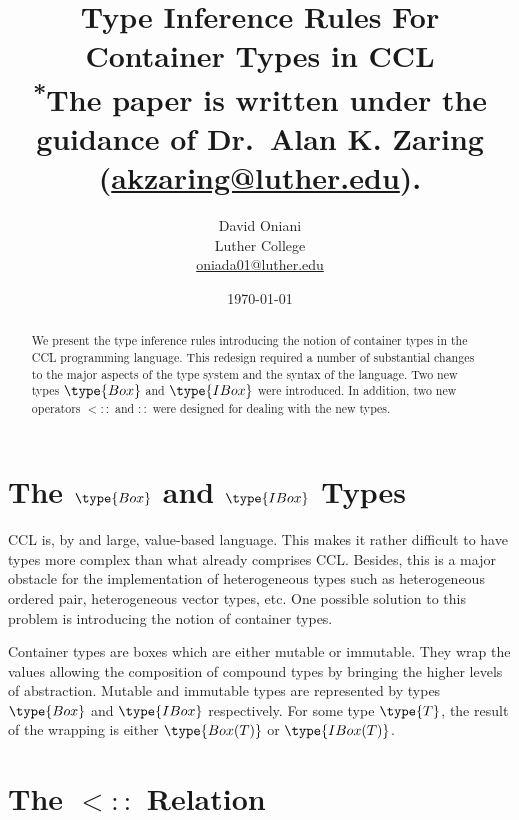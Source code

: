 \documentclass{article}
\author{David Oniani\\
        Luther College\\
        \href{mailto:oniada01@luther.edu}{oniada01@luther.edu}}
\title{\textbf{Type Inference Rules For Container Types in CCL}\\
       \medskip
       \small \textsuperscript{*}The paper is written under the guidance of
       Dr.\ Alan K. Zaring
       (\href{mailto:akzaring@luther.edu}{akzaring@luther.edu}).}
\date{\today}
\newcommand\ltypeof{\mathrel{::}}
\newcommand\subtypecont{\mathrel{<::}}
\begin{document}
\maketitle


\begin{abstract}
\noindent We present the type inference rules introducing the notion of
container types in the CCL programming language. This redesign required a
number of substantial changes to the major aspects of the type system and the
syntax of the language. Two new types $\type{Box}$ and $\type{IBox}$ were
introduced. In addition, two new operators $\subtypecont$ and $\ltypeof$ were
designed for dealing with the new types.
\end{abstract}


\section*{The $\type{Box}$ and $\type{IBox}$ Types}

CCL is, by and large, value-based language. This makes it rather difficult to
have types more complex than what already comprises CCL. Besides, this is a
major obstacle for the implementation of heterogeneous types such as
heterogeneous ordered pair, heterogeneous vector types, etc. One possible
solution to this problem is introducing the notion of container types.

\medskip

Container types are boxes which are either mutable or immutable. They wrap the
values allowing the composition of compound types by bringing the higher levels
of abstraction. Mutable and immutable types are represented by types
$\type{Box}$ and $\type{IBox}$ respectively. For some type $\type{T}$, the
result of the wrapping is either $\type{Box(T)}$ or $\type{IBox(T)}$.


\section*{The $\subtypecont$ Relation}
\end{document}
